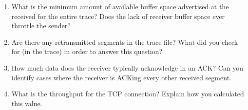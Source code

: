 \begin{enumerate}[label=\bfseries Problem \arabic*:,leftmargin=*,labelindent=1em]
        \item What is the minimum amount of available buffer space advertised at the received for the entire trace? Does the lack of receiver buffer space ever throttle the sender?\\[0.2mm]
        \soln
        \item Are there any retransmitted segments in the trace file? What did you check for (in the trace) in order to answer this question?\\[0.2mm]
        \soln
        \item How much data does the receiver typically acknowledge in an ACK? Can you identify cases where the receiver is ACKing every other received segment.\\[0.2mm]
        \soln
        \item What is the throughput for the TCP connection? Explain how you calculated this value.\\[0.2mm]
        \soln
    \end{enumerate}
\newpage